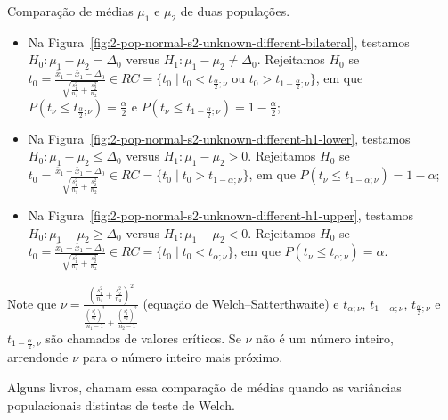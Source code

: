 \documentclass[9pt]{beamer}
\begin{document}
\begin{frame}{Comparação de médias $\mu_1$ e $\mu_2$ de duas populações.}

\footnotesize

\begin{itemize}
	\item Na Figura~\ref{fig:2-pop-normal-s2-unknown-different-bilateral}, testamos $H_0: \mu_1 - \mu_2 = \Delta_0$ versus $H_1: \mu_1 - \mu_2 \neq \Delta_0$. Rejeitamos $H_0$ se $t_0 = \frac{\bar{x}_1 - \bar{x}_1 - \Delta_0}{ \sqrt{ \frac{s_1^2}{n_1} + \frac{s_2^2}{n_2} } } \in  RC=\{t_0 \mid t_0 < t_{\frac{\alpha}{2};\nu} \allowbreak \mbox{ ou } t_0 > t_{1-\frac{\alpha}{2};\nu} \}$, em que $P\left(t_{\nu} \leq t_{\frac{\alpha}{2}; \nu} \right) = \frac{\alpha}{2}$ e $P\left(t_{\nu} \leq t_{1-\frac{\alpha}{2}; \nu} \right) = 1 - \frac{\alpha}{2}$;
	\vfill
	
	\item Na Figura~\ref{fig:2-pop-normal-s2-unknown-different-h1-lower}, testamos $H_0: \mu_1 - \mu_2 \leq \Delta_0 $ versus $H_1: \mu_1 - \mu_2 > 0$. Rejeitamos $H_0$ se $t_0 = \frac{\bar{x}_1 - \bar{x}_1 - \Delta_0}{ \sqrt{ \frac{s_1^2}{n_1} + \frac{s_2^2}{n_2} } } \in \allowbreak RC=\{t_0 \mid t_0 > t_{1-\alpha; \nu}  \}$, em que $P\left(t_{\nu} \leq  t_{1-\alpha;\nu} \right) =1- \alpha$;
	\vfill
	
	\item Na Figura~\ref{fig:2-pop-normal-s2-unknown-different-h1-upper}, testamos $H_0: \mu_1 - \mu_2 \geq \Delta_0$ versus $H_1: \mu_1 - \mu_2  < 0$. Rejeitamos $H_0$ se $t_0 = \frac{\bar{x}_1 - \bar{x}_1 - \Delta_0}{ \sqrt{ \frac{s_1^2}{n_1} + \frac{s_2^2}{n_2} } } \in \allowbreak RC=\{t_0 \mid t_0 < t_{\alpha;\nu}  \}$, em que $P\left(t_{\nu} \leq t_{\alpha;\nu} \right) = \alpha$.
\end{itemize}
Note que $\nu = \frac{\left( \frac{s_1^2}{n_1} + \frac{s_2^2}{n_2} \right)^2}{ \frac{\left( \frac{s_1^2}{n_1} \right)^2}{n_1-1} + \frac{\left( \frac{s_2^2}{n_2} \right)^2}{n_2-1} }$ (equação de Welch–Satterthwaite) e $t_{\alpha;\nu}$, $t_{1-\alpha;\nu}$, $t_{\frac{\alpha}{2};\nu}$ e $t_{1-\frac{\alpha}{2};\nu}$ são chamados de valores críticos. Se $\nu$ não é um número inteiro, arrendonde $\nu$ para o número inteiro mais próximo.

Alguns livros, chamam essa comparação de médias quando as variâncias populacionais distintas de teste de Welch.

\normalsize

\end{frame}
\end{document}
